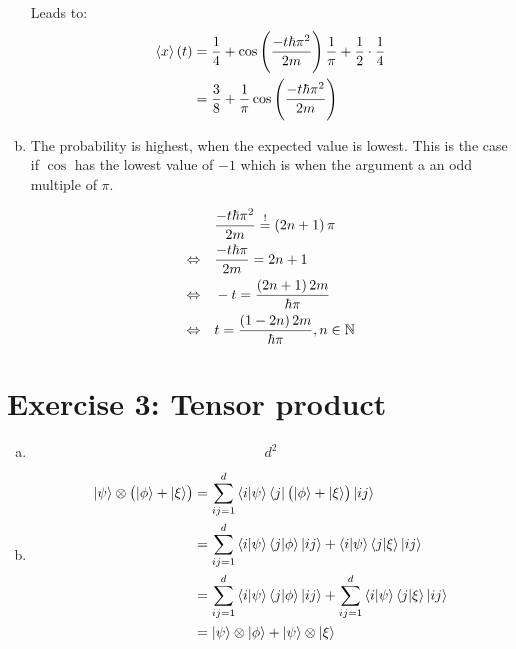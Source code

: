 \documentclass[a4paper,german,12pt,smallheadings]{scrartcl}
\begin{document}
\begin{enumerate}[a)]
    Leads to:
    \begin{align*}
      \braket{x}(t) &= \frac{1}{4} + \cos\del{\frac{-t \hbar \pi^2}{2m}} \frac{1}{\pi} + \frac{1}{2} \cdot \frac{1}{4} \\
                    &= \frac{3}{8} + \frac{1}{\pi} \cos\del{\frac{-t \hbar \pi^2}{2m}}
    \end{align*}
  \item
    The probability is highest, when the expected value is lowest. This is the
    case if $\cos$ has the lowest value of $-1$ which is when the argument a an
    odd multiple of $\pi$.

    \begin{align*}
      &\frac{-t \hbar \pi^2}{2m} \overset{!}{=} \del{2n + 1} \pi \\
      \Leftrightarrow\quad
      &\frac{-t \hbar \pi}{2m} = 2n + 1 \\
      \Leftrightarrow\quad
      &-t = \frac{\del{2n + 1}2m}{\hbar \pi} \\
      \Leftrightarrow\quad
      &t = \frac{\del{1-2n}2m}{\hbar \pi}, n \in \mathbb{N} \\
    \end{align*}




\end{enumerate}

\section*{Exercise 3: Tensor product}
\begin{enumerate}[a)]
  \item
    \begin{equation*}
      d^2
    \end{equation*}
  \item
    \begin{align*}
      \ket{\psi} \otimes \del{\ket{\phi} + \ket{\xi}} &= \sum_{ij=1}^d \braket{i|\psi} \bra{j} \del{\ket\phi + \ket\xi} \ket{ij} \\
      &= \sum_{ij=1}^d \braket{i|\psi} \braket{j|\phi}\ket{ij} + \braket{i|\psi} \braket{j|\xi} \ket{ij} \\
      &= \sum_{ij=1}^d \braket{i|\psi} \braket{j|\phi}\ket{ij} + \sum_{ij=1}^d \braket{i|\psi} \braket{j|\xi} \ket{ij} \\
      &= \ket\psi \otimes \ket\phi + \ket\psi \otimes \ket\xi
    \end{align*}
\end{enumerate}
\end{document}
